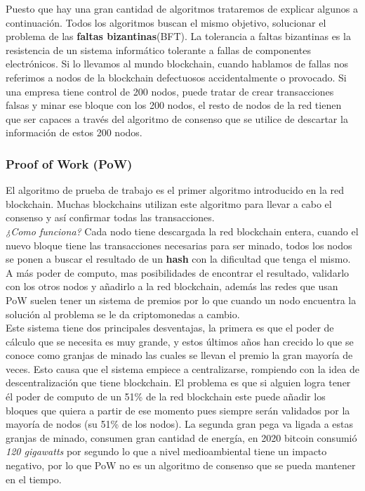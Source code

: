 Puesto que hay una gran cantidad de algoritmos trataremos de explicar algunos a continuación\cite{algoConsenso}. Todos los algoritmos buscan el mismo objetivo, solucionar el problema de las \textbf{faltas bizantinas}(BFT)\cite{BFT}. La tolerancia a faltas bizantinas es la resistencia de un sistema informático tolerante a fallas de componentes electrónicos. Si lo llevamos al mundo blockchain, cuando hablamos de fallas nos referimos a nodos de la blockchain defectuosos accidentalmente o provocado. Si una empresa tiene control de 200 nodos, puede tratar de crear transacciones falsas y minar ese bloque con los 200 nodos, el resto de nodos de la red tienen que ser capaces a través del algoritmo de consenso que se utilice de descartar la información de estos 200 nodos.

\subsubsection{Proof of Work (PoW)}

El algoritmo de prueba de trabajo es el primer algoritmo introducido en la red blockchain. Muchas blockchains utilizan este algoritmo para llevar a cabo el consenso y así confirmar todas las transacciones. \\ 

\emph{¿Como funciona?} Cada nodo tiene descargada la red blockchain entera, cuando el nuevo bloque tiene las transacciones necesarias para ser minado, todos los nodos se ponen a buscar el resultado de un \textbf{hash} con la dificultad que tenga el mismo. A más poder de computo, mas posibilidades de encontrar el resultado, validarlo con los otros nodos y añadirlo a la red blockchain, además las redes que usan PoW suelen tener un sistema de premios por lo que cuando un nodo encuentra la solución al problema se le da criptomonedas a cambio. \\

Este sistema tiene dos principales desventajas, la primera es que el poder de cálculo que se necesita es muy grande, y estos últimos años han crecido lo que se conoce como granjas de minado las cuales se llevan el premio la gran mayoría de veces. Esto causa que el sistema empiece a centralizarse, rompiendo con la idea de descentralización que tiene blockchain. El problema es que si alguien logra tener él poder de computo de un 51\% de la red blockchain este puede añadir los bloques que quiera a partir de ese momento pues siempre serán validados por la mayoría de nodos (su 51\% de los nodos). La segunda gran pega va ligada a estas granjas de minado, consumen gran cantidad de energía, en 2020 bitcoin consumió \emph{120 gigawatts} por segundo\cite{bitcoinEnergyUse} lo que a nivel medioambiental tiene un impacto negativo, por lo que PoW no es un algoritmo de consenso que se pueda mantener en el tiempo.

